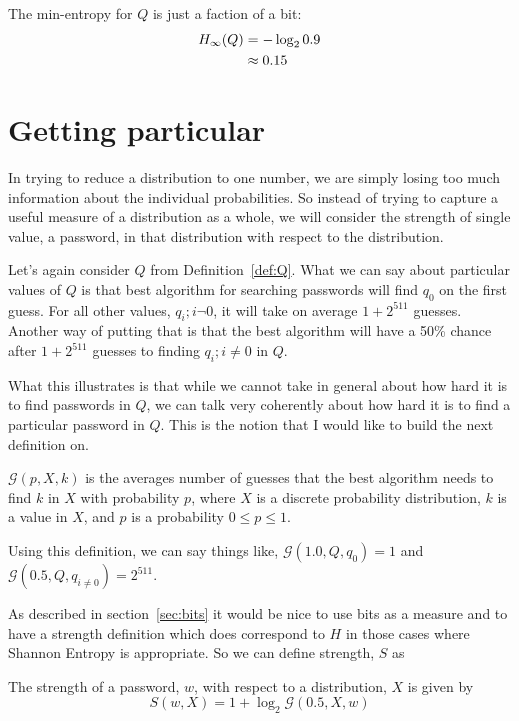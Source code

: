 \documentclass[12pt]{article}
\newcommand\G{\ensuremath{\mathcal{G}}}
\begin{document}
The min-entropy for $Q$ is just a faction of a bit:
\begin{align}
H_\infty(Q) &= -\log_2 0.9 \notag \\
            &\approx 0.15 \label{eq:exME}
\end{align}
    

\section{Getting particular}

In trying to reduce a distribution to one number, we are simply losing too much information about the individual probabilities. So instead of trying to capture a useful measure of a distribution as a whole, we will consider the strength of single value, a password, in that distribution with respect to the distribution.

Let's again consider $Q$ from Definition~\ref{def:Q}. What we can say about particular values of $Q$ is that best algorithm for searching passwords will find $q_0$ on the first guess. For all other values, $q_i; i \neg 0$, it will take on average $1+2^{511}$ guesses. Another way of putting that is that the best algorithm will have a 50\% chance after $1+2^{511}$ guesses to finding $q_i; i\neq0$ in $Q$.

What this illustrates is that while we cannot take in general about how hard it is to find passwords in $Q$, we can talk very coherently about how hard it is to find a particular password in $Q$. This is the notion that I would like to build the next definition on.

\begin{Definition}[Guesses Function, \(\G\)] \label{def:calG}
$\G(p, X, k)$ is the averages number of guesses that the best algorithm needs to find $k$ in $X$ with probability $p$, where $X$ is a discrete probability distribution, $k$ is a value in $X$, and $p$ is a probability $0 \leq p \leq 1$.
\end{Definition}

Using this definition, we can say things like, $\G(1.0, Q, q_0) = 1$ and $\G(0.5, Q, q_{i\neq 0}) = 2^{511}$.

As described in section~\ref{sec:bits} it would be nice to use bits as a measure and to have a strength definition which does correspond to $H$ in those cases where Shannon Entropy is appropriate. So we can define strength, $S$ as

\begin{Definition} \label{def:S}
The strength of a password, $w$, with respect to a distribution, $X$ is given by
$$
S(w, X) =  1 + \log_2\G(0.5, X, w)
$$
\end{Definition}
\end{document}
